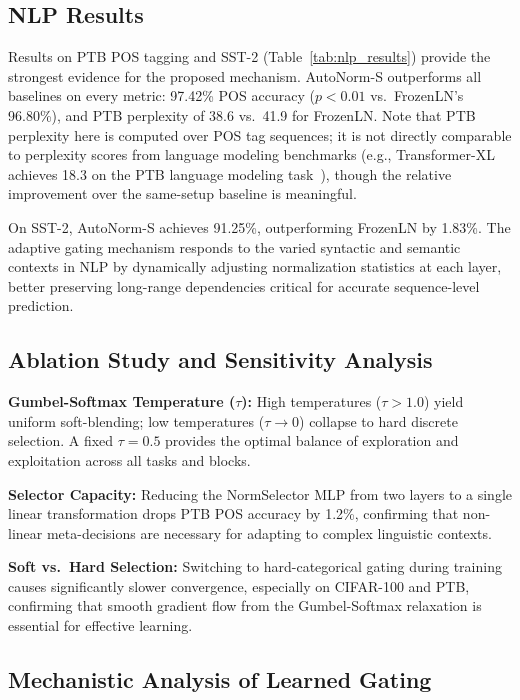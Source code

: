 \documentclass[conference]{IEEEtran}
\begin{document}
\subsection{NLP Results}
\label{sec:nlp}

Results on PTB POS tagging and SST-2
(Table~\ref{tab:nlp_results}) provide the strongest evidence for the
proposed mechanism. AutoNorm-S outperforms all baselines on every
metric: 97.42\% POS accuracy ($p < 0.01$ vs.\ FrozenLN's 96.80\%),
and PTB perplexity of 38.6 vs.\ 41.9 for FrozenLN. Note that PTB
perplexity here is computed over POS tag sequences; it is not
directly comparable to perplexity scores from language modeling
benchmarks (e.g., Transformer-XL achieves 18.3 on the PTB language
modeling task~\cite{dai2019transformerxl}), though the relative
improvement over the same-setup baseline is meaningful.

On SST-2, AutoNorm-S achieves 91.25\%, outperforming FrozenLN by
1.83\%. The adaptive gating mechanism responds to the varied syntactic
and semantic contexts in NLP by dynamically adjusting normalization
statistics at each layer, better preserving long-range dependencies
critical for accurate sequence-level prediction.

\subsection{Ablation Study and Sensitivity Analysis}

\textbf{Gumbel-Softmax Temperature ($\tau$):} High temperatures
($\tau > 1.0$) yield uniform soft-blending; low temperatures
($\tau \to 0$) collapse to hard discrete selection. A fixed
$\tau = 0.5$ provides the optimal balance of exploration and
exploitation across all tasks and blocks.

\textbf{Selector Capacity:} Reducing the NormSelector MLP from two
layers to a single linear transformation drops PTB POS accuracy by
1.2\%, confirming that non-linear meta-decisions are necessary for
adapting to complex linguistic contexts.

\textbf{Soft vs.\ Hard Selection:} Switching to hard-categorical
gating during training causes significantly slower convergence,
especially on CIFAR-100 and PTB, confirming that smooth gradient flow
from the Gumbel-Softmax relaxation is essential for effective learning.

\subsection{Mechanistic Analysis of Learned Gating}
\end{document}
